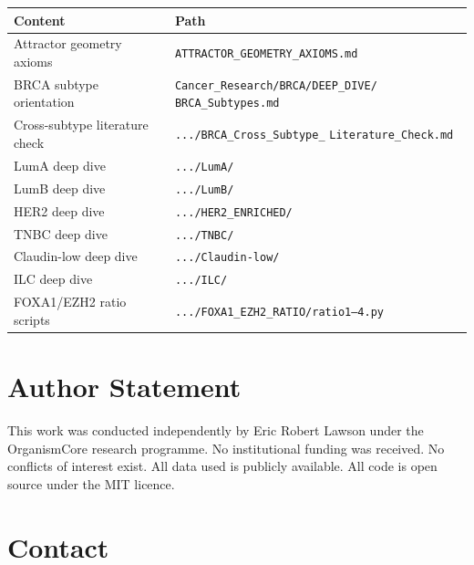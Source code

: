 \documentclass[12pt, a4paper]{article}
\begin{document}
\begin{center}
\begin{tabular}{ll}
\toprule
\textbf{Content} & \textbf{Path} \\
\midrule
Attractor geometry axioms
& \texttt{ATTRACTOR\_GEOMETRY\_AXIOMS.md} \\
BRCA subtype orientation
& \texttt{Cancer\_Research/BRCA/DEEP\_DIVE/}
  \texttt{BRCA\_Subtypes.md} \\
Cross-subtype literature check
& \texttt{.../BRCA\_Cross\_Subtype\_}
  \texttt{Literature\_Check.md} \\
LumA deep dive & \texttt{.../LumA/} \\
LumB deep dive & \texttt{.../LumB/} \\
HER2 deep dive & \texttt{.../HER2\_ENRICHED/} \\
TNBC deep dive & \texttt{.../TNBC/} \\
Claudin-low deep dive & \texttt{.../Claudin-low/} \\
ILC deep dive & \texttt{.../ILC/} \\
FOXA1/EZH2 ratio scripts
& \texttt{.../FOXA1\_EZH2\_RATIO/ratio1--4.py} \\
\bottomrule
\end{tabular}
\end{center}

\section*{Author Statement}

This work was conducted independently by Eric Robert
Lawson under the OrganismCore research programme. No
institutional funding was received. No conflicts of
interest exist. All data used is publicly available.
All code is open source under the MIT licence.

\section*{Contact}
\end{document}
